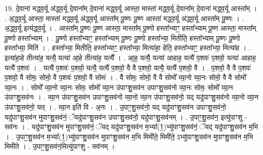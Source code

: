 \documentclass[17pt]{extarticle}
\begin{document}
19. दे॒वाना॑ मद्ध्व॒र्यू अ॑द्ध्व॒र्यू दे॒वाना᳚म् दे॒वाना॑ मद्ध्व॒र्यू आस्ता॒ मास्ता॑ मद्ध्व॒र्यू दे॒वाना᳚म् दे॒वाना॑ मद्ध्व॒र्यू आस्ता᳚म् । . अ॒द्ध्व॒र्यू आस्ता॒ मास्ता॑ मद्ध्व॒र्यू अ॑द्ध्व॒र्यू आस्ता᳚म् पू॒ष्णः पू॒ष्ण आस्ता॑ मद्ध्व॒र्यू अ॑द्ध्व॒र्यू आस्ता᳚म् पू॒ष्णः । . अ॒द्ध्व॒र्यू इत्य॑द्ध्व॒र्यू । . आस्ता᳚म् पू॒ष्णः पू॒ष्ण आस्ता॒ मास्ता᳚म् पू॒ष्णो हस्ता᳚भ्याꣳ॒॒ हस्ता᳚भ्याम् पू॒ष्ण आस्ता॒ मास्ता᳚म् पू॒ष्णो हस्ता᳚भ्याम् । . पू॒ष्णो हस्ता᳚भ्याꣳ॒॒ हस्ता᳚भ्याम् पू॒ष्णः पू॒ष्णो हस्ता᳚भ्या॒ मितीति॒ हस्ता᳚भ्याम् पू॒ष्णः पू॒ष्णो हस्ता᳚भ्या॒ मिति॑ । . हस्ता᳚भ्या॒ मितीति॒ हस्ता᳚भ्याꣳ॒॒ हस्ता᳚भ्या॒ मित्या॑हा॒ हेति॒ हस्ता᳚भ्याꣳ॒॒ हस्ता᳚भ्या॒ मित्या॑ह । . इत्या॑हा॒हे तीत्या॑ह॒ यत्यै॒ यत्या॑ आ॒हे तीत्या॑ह॒ यत्यै᳚ । . आ॒ह॒ यत्यै॒ यत्या॑ आहाह॒ यत्यै॑ प॒शवः॑ प॒शवो॒ यत्या॑ आहाह॒ यत्यै॑ प॒शवः॑ । . यत्यै॑ प॒शवः॑ प॒शवो॒ यत्यै॒ यत्यै॑ प॒शवो॒ वै वै प॒शवो॒ यत्यै॒ यत्यै॑ प॒शवो॒ वै । . प॒शवो॒ वै वै प॒शवः॑ प॒शवो॒ वै सोमः॒ सोमो॒ वै प॒शवः॑ प॒शवो॒ वै सोमः॑ । . वै सोमः॒ सोमो॒ वै वै सोमो᳚ व्या॒नो व्या॒नः सोमो॒ वै वै सोमो᳚ व्या॒नः । . सोमो᳚ व्या॒नो व्या॒नः सोमः॒ सोमो᳚ व्या॒न उ॑पाꣳशु॒सव॑न उपाꣳशु॒सव॑नो व्या॒नः सोमः॒ सोमो᳚ व्या॒न उ॑पाꣳशु॒सव॑नः । . व्या॒न उ॑पाꣳशु॒सव॑न उपाꣳशु॒सव॑नो व्या॒नो व्या॒न उ॑पाꣳशु॒सव॑नो॒ यद् यदु॑पाꣳशु॒सव॑नो व्या॒नो व्या॒न उ॑पाꣳशु॒सव॑नो॒ यत् । . व्या॒न इति॑ वि - अ॒नः । . उ॒पाꣳ॒॒शु॒सव॑नो॒ यद् यदु॑पाꣳशु॒सव॑न उपाꣳशु॒सव॑नो॒ यदु॑पाꣳशु॒सव॑न मुपाꣳशु॒सव॑नं॒ ॅयदु॑पाꣳशु॒सव॑न उपाꣳशु॒सव॑नो॒ यदु॑पाꣳशु॒सव॑नम् । . उ॒पाꣳ॒॒शु॒सव॑न॒ इत्यु॑पाꣳशु - सव॑नः । . यदु॑पाꣳशु॒सव॑न मुपाꣳशु॒सव॑नं॒ ॅयद् यदु॑पाꣳशु॒सव॑न म॒भ्या᳚(1॒)भ्यु॑पाꣳशु॒सव॑नं॒ ॅयद् यदु॑पाꣳशु॒सव॑न म॒भि । . उ॒पाꣳ॒॒शु॒सव॑न म॒भ्या᳚(1॒)भ्यु॑पाꣳशु॒सव॑न मुपाꣳशु॒सव॑न म॒भि मिमी॑ते॒ मिमी॑ते॒ ऽभ्यु॑पाꣳशु॒सव॑न मुपाꣳशु॒सव॑न म॒भि मिमी॑ते । . उ॒पाꣳ॒॒शु॒सव॑न॒मित्यु॑पाꣳशु - सव॑नम् । \newline
\end{document}
